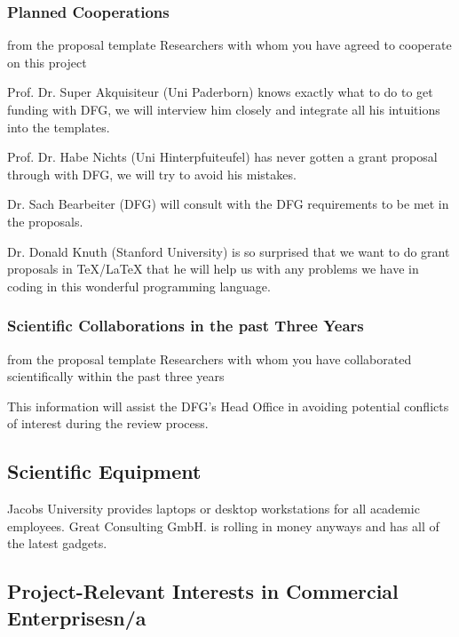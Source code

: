 \subsubsection{Planned Cooperations}\label{sec:coop:planned}
\begin{todo}{from the proposal template}
  Researchers with whom you have agreed to cooperate on this project
\end{todo}
\begin{compactdesc}
\item[Prof. Dr. Super Akquisiteur (Uni Paderborn)] knows exactly what to do to get funding
  with DFG, we will interview him closely and integrate all his intuitions into the {\pn}
  templates.
\item[Prof. Dr. Habe Nichts (Uni Hinterpfuiteufel)] has never gotten a grant proposal
  through with DFG, we will try to avoid his mistakes.
\item[Dr. Sach Bearbeiter (DFG)] will consult with the DFG requirements to be met in the
  proposals.
\item[Dr. Donald Knuth (Stanford University)] is so surprised that we want to do grant
  proposals in {\TeX/\LaTeX} that he will help us with any problems we have in coding in
  this wonderful programming language.
\end{compactdesc}

\subsubsection{Scientific Collaborations in the past Three Years}\label{sec:past-coop}

\begin{todo}{from the proposal template}
  Researchers with whom you have collaborated scientifically within the past three years

  This information will assist the DFG’s Head Office in avoiding potential conflicts of
  interest during the review process.
\end{todo}

\subsection{Scientific Equipment}\label{sec:req:equipment}

Jacobs University provides laptops or desktop workstations for all academic
employees. Great Consulting GmbH. is rolling in money anyways and has all of the latest
gadgets.


\subsection{Project-Relevant Interests in Commercial Enterprises\qquad n/a}


